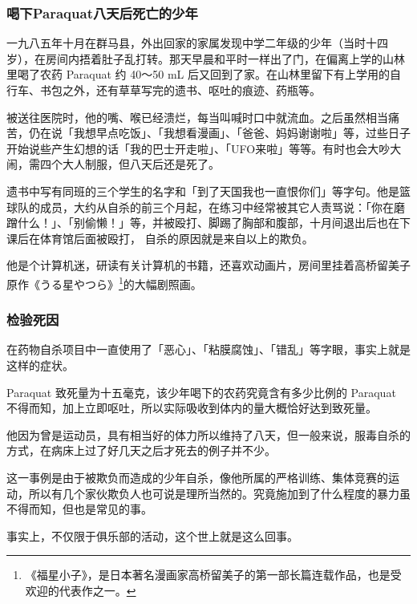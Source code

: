 \documentclass[UTF8]{ctexart}
\begin{document}
\subsubsection*{喝下Paraquat八天后死亡的少年}

一九八五年十月在群马县，外出回家的家属发现中学二年级的少年（当时十四岁），在房间内捂着肚子乱打转。那天早晨和平时一样出了门，在偏离上学的山林里喝了农药 Paraquat 约 40～50 mL 后又回到了家。在山林里留下有上学用的自行车、书包之外，还有草草写完的遗书、呕吐的痕迹、药瓶等。

被送往医院时，他的嘴、喉已经溃烂，每当叫喊时口中就流血。之后虽然相当痛苦，仍在说「我想早点吃饭」、「我想看漫画」、「爸爸、妈妈谢谢啦」等，过些日子开始说些产生幻想的话「我的巴士开走啦」、「UFO来啦」等等。有时也会大吵大闹，需四个大人制服，但八天后还是死了。

遗书中写有同班的三个学生的名字和「到了天国我也一直恨你们」等字句。他是篮球队的成员，大约从自杀的前三个月起，在练习中经常被其它人责骂说：「你在磨蹭什么！」、「别偷懒！」等，并被殴打、脚踢了胸部和腹部，十月间退出后也在下课后在体育馆后面被殴打， 自杀的原因就是来自以上的欺负。

他是个计算机迷，研读有关计算机的书籍，还喜欢动画片，房间里挂着高桥留美子原作《うる星やつら》\footnote{《福星小子》，是日本著名漫画家高桥留美子的第一部长篇连载作品，也是受欢迎的代表作之一。}的大幅剧照画。

\subsubsection*{检验死因}

在药物自杀项目中一直使用了「恶心」、「粘膜腐蚀」、「错乱」等字眼，事实上就是这样的症状。

Paraquat 致死量为十五毫克，该少年喝下的农药究竟含有多少比例的 Paraquat 不得而知，加上立即呕吐，所以实际吸收到体内的量大概恰好达到致死量。

他因为曾是运动员，具有相当好的体力所以维持了八天，但一般来说，服毒自杀的方式，在病床上过了好几天之后才死去的例子并不少。

这一事例是由于被欺负而造成的少年自杀，像他所属的严格训练、集体竞赛的运动，所以有几个家伙欺负人也可说是理所当然的。究竟施加到了什么程度的暴力虽不得而知，但也是常见的事。

事实上，不仅限于俱乐部的活动，这个世上就是这么回事。

\newpage
\end{document}
